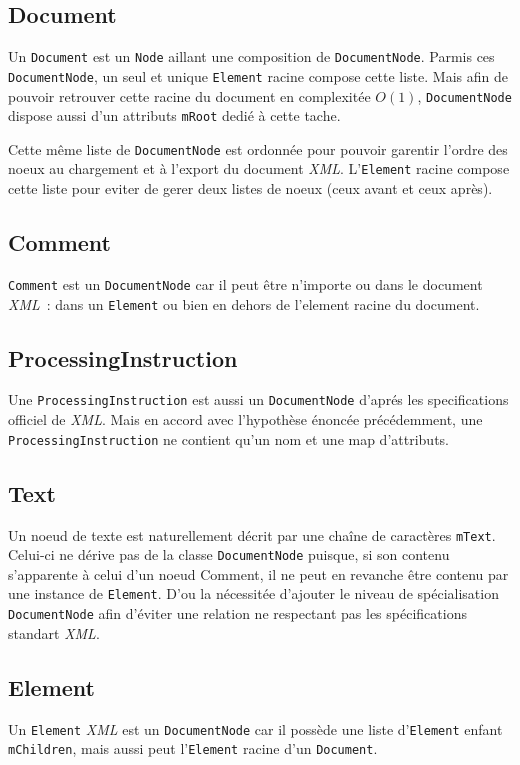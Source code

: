     \subsection{Document}
        Un \lstinline$Document$ est un \lstinline$Node$ aillant une composition de \lstinline$DocumentNode$. Parmis ces \lstinline$DocumentNode$, un seul et unique \lstinline$Element$ racine compose cette liste. Mais afin de pouvoir retrouver cette racine du document en complexit\'ee $O(1)$, \lstinline$DocumentNode$ dispose aussi d'un attributs \lstinline$mRoot$ dedi\'e \`a cette tache.

        Cette m\^eme liste de \lstinline$DocumentNode$ est ordonn\'ee pour pouvoir garentir l'ordre des noeux au chargement et \`a l'export du document \textit{XML}. L'\lstinline$Element$ racine compose cette liste pour eviter de gerer deux listes de noeux (ceux avant et ceux apr\`es).

    \subsection{Comment}
        \lstinline$Comment$ est un \lstinline$DocumentNode$ car il peut \^etre n'importe ou dans le document \textit{XML}~: dans un \lstinline$Element$ ou bien en dehors de l'element racine du document.

    \subsection{ProcessingInstruction}
        Une \lstinline$ProcessingInstruction$ est aussi un \lstinline$DocumentNode$ d'apr\'es les specifications officiel de \textit{XML}. Mais en accord avec l'hypothèse énoncée précédemment, une \lstinline$ProcessingInstruction$ ne contient qu'un nom et une map d'attributs.

    \subsection{Text}
        Un noeud de texte est naturellement décrit par une chaîne de caractères \lstinline$mText$. Celui-ci ne dérive pas de la classe \lstinline$DocumentNode$ puisque, si son contenu s'apparente à celui d'un noeud Comment, il ne peut en revanche être contenu par une instance de \lstinline$Element$. D'ou la nécessit\'ee d'ajouter le niveau de spécialisation \lstinline$DocumentNode$ afin d'éviter une relation ne respectant pas les sp\'ecifications standart \textit{XML}.

    \subsection{Element}
        Un \lstinline$Element$ \textit{XML} est un \lstinline$DocumentNode$ car il poss\`ede une liste d'\lstinline$Element$ enfant \lstinline$mChildren$, mais aussi peut l'\lstinline$Element$ racine d'un \lstinline$Document$.


